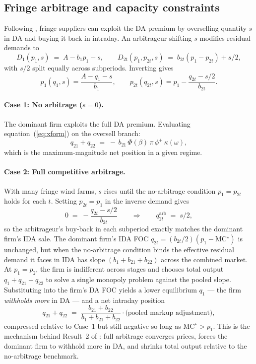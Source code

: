 \documentclass[11pt,a4paper]{article}
\begin{document}
\subsection{Fringe arbitrage and capacity constraints}

Following \citet{ito2016}, fringe suppliers can exploit the DA premium by
overselling quantity $s$ in DA and buying it back in intraday. An
arbitrageur shifting $s$ modifies residual demands to
\[
D_1(p_1,s) \;=\; A - b_1 p_1 - s,
\qquad
D_{2t}(p_1,p_{2t},s) \;=\; b_{2t}(p_1-p_{2t}) + s/2,
\]
with $s/2$ split equally across subperiods. Inverting gives
\[
p_1(q_1,s) = \frac{A - q_1 - s}{b_1},
\qquad
p_{2t}(q_{2t},s) = p_1 - \frac{q_{2t} - s/2}{b_{2t}}.
\]

\paragraph{Case 1: No arbitrage ($s=0$).} The dominant firm exploits the
full DA premium. Evaluating equation~(\ref{eq:xform}) on the oversell
branch:
\[
q_{21}+q_{22}
   \;=\; -\,b_{21}\,\Phi(\beta)\,\pi\,\phi^+\,\kappa(\omega),
\]
which is the maximum-magnitude net position in a given regime.

\paragraph{Case 2: Full competitive arbitrage.} With many fringe wind
farms, $s$ rises until the no-arbitrage condition $p_1 = p_{2t}$ holds
for each $t$. Setting $p_{2t} = p_1$ in the inverse demand gives
\[
0 \;=\; -\frac{q_{2t} - s/2}{b_{2t}}
\qquad\Longrightarrow\qquad
q_{2t}^{\mathrm{arb}} \;=\; s/2,
\]
so the arbitrageur's buy-back in each subperiod exactly matches the
dominant firm's IDA sale. The dominant firm's IDA FOC
$q_{2t} = (b_{2t}/2)(p_1-\mathrm{MC}^\star)$ is unchanged, but when the
no-arbitrage condition binds the effective residual demand it faces in
IDA has slope $(b_1+b_{21}+b_{22})$ across the combined market. At
$p_1=p_2$, the firm is indifferent across stages and chooses total
output $q_1 + q_{21} + q_{22}$ to solve a single monopoly problem
against the pooled slope. Substituting into the firm's DA FOC yields a
lower equilibrium $q_1$ --- the firm \emph{withholds more} in DA ---
and a net intraday position
\[
q_{21}+q_{22}
   \;=\; \frac{b_{21}+b_{22}}{b_1+b_{21}+b_{22}}
         \cdot\bigl(\text{pooled markup adjustment}\bigr),
\]
compressed relative to Case~1 but still negative so long as
$\mathrm{MC}^\star > p_1$. This is the mechanism behind Result~2 of
\citet{ito2016}: full arbitrage converges prices, forces the dominant
firm to withhold more in DA, and shrinks total output relative to the
no-arbitrage benchmark.
\end{document}
